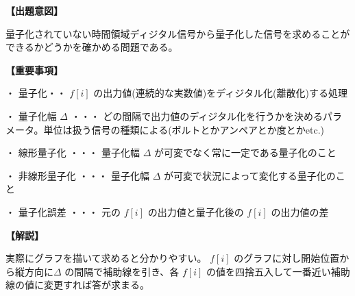 \noindent \textbf{【出題意図】}

\noindent 量子化されていない時間領域ディジタル信号から量子化した信号を求めることができるかどうかを確かめる問題である。

\vspace{1em}
\noindent \textbf{【重要事項】}

\medskip
\noindent ・ 量子化・・ $f[i]$ の出力値(連続的な実数値)をディジタル化(離散化)する処理

\medskip
\noindent ・ 量子化幅 $\Delta$ ・・・ どの間隔で出力値のディジタル化を行うかを決めるパラメータ。単位は扱う信号の種類による(ボルトとかアンペアとか度とかetc.)

\medskip
\noindent ・ 線形量子化 ・・・ 量子化幅  $\Delta$ が可変でなく常に一定である量子化のこと

\medskip
\noindent ・ 非線形量子化 ・・・ 量子化幅  $\Delta$ が可変で状況によって変化する量子化のこと

\medskip
\noindent ・ 量子化誤差 ・・・ 元の $f[i]$ の出力値と量子化後の $f[i]$ の出力値の差

\vspace{1em}
\noindent \textbf{【解説】}

\noindent 実際にグラフを描いて求めると分かりやすい。
$f[i]$ のグラフに対し開始位置から縦方向に$\Delta$ の間隔で補助線を引き、各 $f[i]$ の値を四捨五入して一番近い補助線の値に変更すれば答が求まる。
